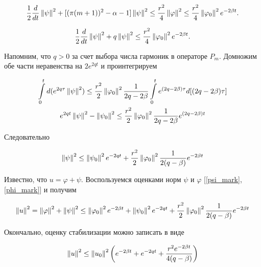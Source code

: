 \begin{equation*}
    \frac{1}{2} \frac{d}{dt} \left\lVert\psi\right\rVert^2  + [(\pi(m + 1))^2 - \alpha - 1] 
    \left\lVert\psi\right\rVert^2 \le \frac{r^2}{4}\left\lVert\varphi\right\rVert^2 \le 
    \frac{r^2}{4}\left\lVert\varphi_0\right\rVert^2 e^{-2\beta t}.
\end{equation*}

\begin{equation}
    \frac{1}{2} \frac{d}{dt} \left\lVert\psi\right\rVert^2 + q\left\lVert\psi\right\rVert^2 \le 
    \frac{r^2}{4}\left\lVert\varphi_0\right\rVert^2 e^{-2\beta t}.
\end{equation}

Напомним, что $q > 0$ за счет выбора числа гармоник в операторе $P_m$.
Домножим обе части неравенства на $2e^{2qt}$ и проинтегрируем

\begin{gather*}
    \int\limits_0^t{d(e^{2q\tau}} \left\lVert\psi\right\rVert^2) \le 
    \frac{r^2}{2} \left\lVert\varphi_0\right\rVert^2 \frac{1}{2q - 2\beta} 
    \int\limits_0^t {e^{(2q -2\beta) \tau} d[(2q -2\beta) \tau]}\\*
    e^{2qt} \left\lVert\psi\right\rVert^2 - \left\lVert\psi_0\right\rVert^2 \le \frac{r^2}{2}
    \left\lVert\varphi_0\right\rVert^2 \frac{1}{2q - 2\beta} e^{(2q -2\beta)t}
\end{gather*}

Следовательно

\begin{equation}\label{psi_mark}
    \left\lVert\psi\right\rVert^2 \le \left\lVert\psi_0\right\rVert^2 e^{-2qt} + \frac{r^2}{2} 
    \left\lVert\varphi_0\right\rVert^2 \frac{1}{2(q - \beta)} e^{-2\beta t}
\end{equation}

Известно, что $u = \varphi + \psi$. Воспользуемся оценками норм $\psi$ и 
$\varphi$ [\eqref{psi_mark}, \eqref{phi_mark}] и получим

\begin{gather*}
    \left\lVert u\right\rVert^2 = \left\lVert\varphi\right\rVert^2 + \left\lVert\psi\right\rVert^2 \le \left\lVert\varphi_0\right\rVert^2 
    e^{-2\beta t} + \left\lVert\psi_0\right\rVert^2 e^{-2qt} + \frac{r^2}{2} \left\lVert\varphi_0\right\rVert^2 
    \frac{1}{2(q - \beta)} e^{-2\beta t}
\end{gather*}

Окончально, оценку стабилизации можно записать в виде

\begin{equation}
    \left\lVert u\right\rVert^2 \le \left\lVert u_0\right\rVert^2 \left( e^{-2\beta t} + e^{-2qt} + 
    \frac{r^2 e^{-2\beta t}}{4(q - \beta)} \right)
\end{equation}
